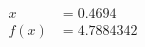 \documentclass[preview]{standalone}
\begin{document}
\begin{align*}
x &= 0.4694\\f(x) &= 4.7884342
\end{align*}
\end{document}
